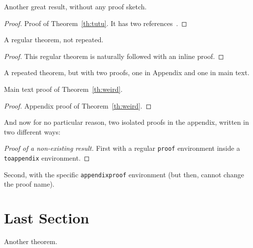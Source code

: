 \begin{theoremrep}
  \label{th:tutu}
  Another great result, without any proof sketch.
\end{theoremrep}

\begin{proof}
  Proof of Theorem~\ref{th:tutu}. It has two
  references~\cite{sitemaps,brin1998anatomy}.
\end{proof}

\begin{theorem}
  A regular theorem, not repeated.
\end{theorem}

\begin{proof}
This regular theorem is naturally followed with an inline proof.
\end{proof}

\begin{theoremrep}
  \label{th:weird}
  A repeated theorem, but with two proofs, one in Appendix and one in
  main text.
\end{theoremrep}

\begin{inlineproof}
  Main text proof of Theorem~\ref{th:weird}.
\end{inlineproof}

\begin{proof}
  Appendix proof of Theorem~\ref{th:weird}.
\end{proof}

\begin{toappendix}
And now for no particular reason, two isolated proofs in the appendix,
  written in two different ways:

  \begin{proof}[Proof of a non-existing result]
    First with a regular \texttt{proof} environment inside a
    \texttt{toappendix} environment.
  \end{proof}
\end{toappendix}

\begin{appendixproof}
  Second, with the specific \texttt{appendixproof} environment (but then,
  cannot change the proof name).
\end{appendixproof}

\section{Last Section}

\begin{theoremrep}
  Another theorem.
\end{theoremrep}


